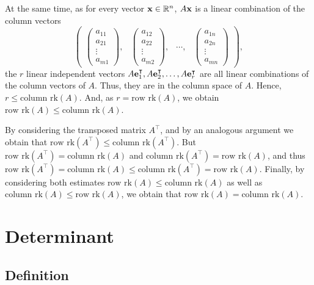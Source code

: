 {At the same time,
as
for every vector ${\bf x}\in {\Bbb R}^n$,
$A{\bf x}$ is a linear combination of the column vectors
$$
\begin{pmatrix}
\begin{pmatrix}
a_{11}\\
a_{21}\\
\vdots \\
a_{m1}
\end{pmatrix},
&
\begin{pmatrix}
a_{12}\\
a_{22}\\
\vdots \\
a_{m2}
\end{pmatrix},
&
\cdots  ,
&
\begin{pmatrix}
a_{1n}\\
a_{2n}\\
\vdots \\
a_{mn}
\end{pmatrix}
\end{pmatrix}
,
$$
the $r$ linear independent vectors
$A{\bf e}_1^\intercal ,A{\bf e}_2^\intercal , \ldots ,A{\bf e}_r^\intercal $
are all linear combinations of the column vectors of $A$.
Thus, they are in the column space of $A$.
Hence, $r\le \textrm{column rk}(A)$.
And, as $r= \textrm{row rk}(A)$,
we obtain
$ \textrm{row rk}(A)\le \textrm{column rk}(A)$.

By considering the transposed matrix $A^\intercal $, and by an analogous argument   we obtain
that
$ \textrm{row rk}(A^\intercal )\le \textrm{column rk}(A^\intercal )$.
But
$ \textrm{row rk}(A^\intercal )= \textrm{column rk}(A)$
and
$ \textrm{column rk}(A^\intercal )= \textrm{row rk}(A)$,
and thus
$ \textrm{row rk}(A^\intercal )= \textrm{column rk}(A)\le \textrm{column rk}(A^\intercal )= \textrm{row rk}(A)$.
Finally, by considering both estimates
$ \textrm{row rk}(A)\le \textrm{column rk}(A)$
as well as
$\textrm{column rk}(A)\le \textrm{row rk}(A)$,
we obtain that
$ \textrm{row rk}(A) = \textrm{column rk}(A)$.
\eproof
}

\section{Determinant}


\subsection{Definition}

